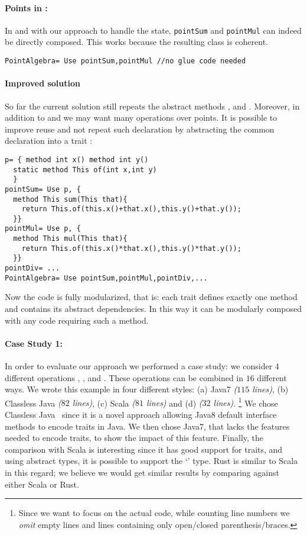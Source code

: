 \paragraph{Points in \name:}
In \name and with our approach to handle the state, 
\lstinline{pointSum} and \lstinline{pointMul} can indeed be directly composed.
This works because the resulting class is coherent.
\saveSpace\saveSpace
\begin{lstlisting}
PointAlgebra= Use pointSum,pointMul //no glue code needed
\end{lstlisting}  
\saveSpace\saveSpace
\noindent

  \paragraph{Improved solution} So far the current solution still
  repeats the abstract methods \Q@x@, \Q@y@ and \Q@of@.
  Moreover, in addition to \Q@sum@ and \Q@mul@ we may want many
  operations over points. It is possible to improve reuse
  and not repeat such declaration by abstracting the common
  declaration into a trait \Q@p@: 
\saveSpace\saveSpace
\begin{lstlisting}
p= { method int x() method int y()
  static method This of(int x,int y)
  }
pointSum= Use p, { 
  method This sum(This that){
    return This.of(this.x()+that.x(),this.y()+that.y());
  }}
pointMul= Use p, { 
  method This mul(This that){
    return This.of(this.x()*that.x(),this.y()*that.y());
  }}
pointDiv= ...
PointAlgebra= Use pointSum,pointMul,pointDiv,...
\end{lstlisting}
\saveSpace\saveSpace      
Now the code is fully modularized, that is: each trait defines exactly one method and contains its abstract dependencies. In this way it can be modularly composed with any code requiring such a method.

\paragraph{Case Study 1:}
In order to evaluate our approach
we performed a case study:
we consider $4$ different operations \Q@Sum@, \Q@Subtraction@, \Q@Multiplication@ and \Q@Division@.
These operations can be combined in $16$ different ways.
We wrote this example in four different styles:
(a) Java7 \emph{($115$ lines)},
(b) Classless Java \emph{($82$ lines)},
(c) Scala \emph{($81$ lines)} and (d) \name \emph{($32$ lines)}.%
\footnote{
Since we want to focus on the actual code, while counting line numbers we \emph{omit} empty lines and lines containing only open/closed
parenthesis/braces.
}
We chose Classless Java~\cite{wang2016classless} since it is a novel approach allowing
Java8 default interface methods to encode traits in Java.
We then chose Java7, that lacks the features needed to encode traits, to show the impact of this feature.
Finally, the comparison with Scala is interesting 
since
it has good support for traits, and using abstract types, it is possible to support the `\Q@This@' type.
Rust is similar to Scala in this regard; we believe we would get similar results by comparing against either Scala or Rust.

